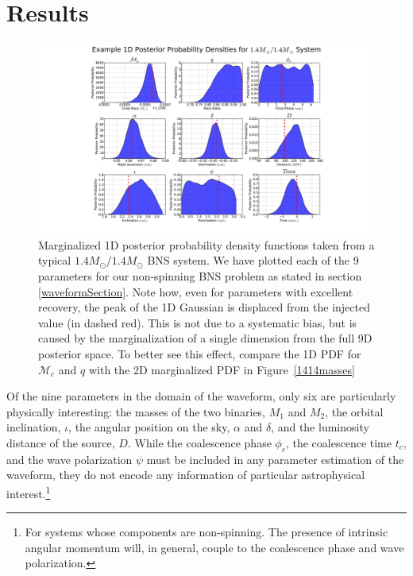 \documentclass[11pt,a4paper]{emulateapj}
\begin{document}
\section{Results}
\label{resultsSection} 

\begin{figure}[t!]
\centering
\includegraphics[trim=7cm 0cm 0cm 0cm, clip=true,scale=0.55]{9dpdf.pdf}
\caption{Marginalized 1D posterior probability density functions taken from a typical 
$1.4M_{\odot}/1.4M_{\odot}$ BNS system.  We have plotted each of the 9 parameters for 
our non-spinning BNS problem as stated in section \ref{waveformSection}.  Note how, 
even for parameters with excellent recovery, the peak of the 1D Gaussian is displaced from 
the injected value (in dashed red).  This is not due to a systematic bias, but is caused by the 
marginalization of a single dimension from the full 9D posterior space.  To better see this effect, 
compare the 1D PDF for $\mathcal{M}_{c}$ and $q$ with the 2D marginalized PDF in Figure~\ref{1414masses}}
\end{figure}

Of the nine parameters in the domain of the waveform, only six are particularly physically
interesting: the masses of the two binaries, $M_1$ and $M_2$, the orbital inclination,
$\iota$, the angular position on the sky, $\alpha$ and $\delta$, and the luminosity 
distance of the source, $D$.  While the coalescence phase $\phi_c$, the coalescence time
$t_c$, and the wave polarization $\psi$ must be included in any parameter estimation of the 
waveform, they do not encode any information of particular astrophysical interest.\footnote{For systems
 whose components are non-spinning.  The presence of intrinsic angular 
momentum will, in general, couple to the coalescence phase and wave polarization.}   
\end{document}
